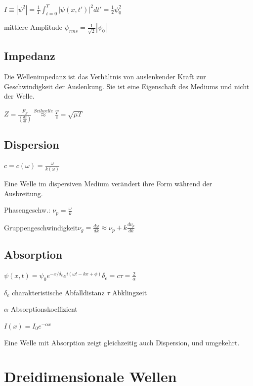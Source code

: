 \documentclass[10pt,a4paper]{scrartcl}
\begin{document}
\begin{multicols*}{3}
	$I\equiv|\psi^2|=\frac{1}{T}\int_{t=0}^T{|\psi(x,t')|^2dt'}=\frac{1}{2}\psi_0^2$
	
	mittlere Amplitude $\psi_{rms}=\frac{1}{\sqrt{2}}|\psi_0|$ 
	
	\subsection{Impedanz}
	
	\small
	Die Wellenimpedanz ist das Verhältnis von auslenkender Kraft zur Geschwindigkeit der Auslenkung. Sie ist eine Eigenschaft des Mediums und nicht der Welle.\normalsize
	
	$Z=\frac{F_Z}{(\frac{dz}{dt})}\overset{Seilwelle}{\approx}\frac{T}{c}=\sqrt{\mu T}$	
	
	
	\subsection{Dispersion}
	
	$c = c(\omega)=\frac{\omega}{k(\omega)}$
	
	\small
	Eine Welle im dispersiven Medium verändert ihre Form während der Ausbreitung.\normalsize
	
	Phasengeschw.: $\nu_p=\frac{\omega}{k}$\hspace{1ex}
	
	Gruppengeschwindigkeit\hspace{1ex}$\nu_g=\frac{d\omega}{dk}\approx\nu_p+k\frac{d\nu_p}{dk}$ 
	
	\subsection{Absorption}
	
	$\psi(x,t)=\psi_0e^{-x/\delta_e}e^{i(\omega t-kx+\phi)}$\hfill$\delta_e=c\tau=\frac{2}{\alpha}$
	
	$\delta_e$ charakteristische Abfalldistanz \hfill $\tau$ Abklingzeit 
	
	$\alpha$ Absorptionskoeffizient
	
	$I(x)=I_0e^{-\alpha x}$
	
	Eine Welle mit Absorption zeigt gleichzeitig auch Dispersion, und umgekehrt.
	
	 
	
	\section{Dreidimensionale Wellen}
	

\end{multicols*}
\end{document}
